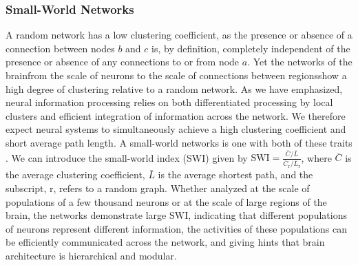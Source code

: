 \subsubsection{Small-World Networks}
A random network has a low clustering coefficient, as the presence or absence of a connection between nodes $b$ and $c$ is, by definition, completely independent of the presence or absence of any connections to or from node $a$. Yet the networks of the brain\textemdash from the scale of neurons to the scale of connections between regions\textemdash show a high degree of clustering relative to a random network. As we have emphasized, neural information processing relies on both differentiated processing by local clusters and efficient integration of information across the network. We therefore expect neural systems to simultaneously achieve a high clustering coefficient and short average path length. A small-world networks is one with both of these traits \cite{wast1998}. We can introduce the small-world index (SWI) \cite{hugu2008} given by  $\mathrm{SWI} = \frac{\bar{C}/\bar{L}}{\bar{C}_{\mathrm{r}}/\bar{L}_{\mathrm{r}}}$, where $\bar{C}$ is the average clustering coefficient, $\bar{L}$ is the average shortest path, and the subscript, $\mathrm{r}$, refers to a random graph. Whether analyzed at the scale of populations of a few thousand neurons or at the scale of large regions of the brain, the networks demonstrate large $\mathrm{SWI}$, indicating that different populations of neurons represent different information, the activities of these populations can be efficiently communicated across the network, and  giving hints that brain architecture is hierarchical and modular.

